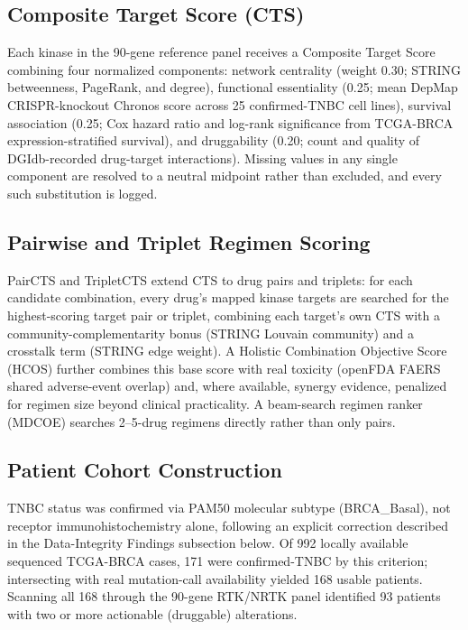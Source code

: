 \documentclass[10pt,letterpaper]{article}
\begin{document}
\subsection*{Composite Target Score (CTS)}
Each kinase in the 90-gene reference panel receives a Composite Target Score combining four normalized components: network centrality (weight 0.30; STRING betweenness, PageRank, and degree), functional essentiality (0.25; mean DepMap CRISPR-knockout Chronos score across 25 confirmed-TNBC cell lines), survival association (0.25; Cox hazard ratio and log-rank significance from TCGA-BRCA expression-stratified survival), and druggability (0.20; count and quality of DGIdb-recorded drug-target interactions). Missing values in any single component are resolved to a neutral midpoint rather than excluded, and every such substitution is logged.

\subsection*{Pairwise and Triplet Regimen Scoring}
PairCTS and TripletCTS extend CTS to drug pairs and triplets: for each candidate combination, every drug's mapped kinase targets are searched for the highest-scoring target pair or triplet, combining each target's own CTS with a community-complementarity bonus (STRING Louvain community) and a crosstalk term (STRING edge weight). A Holistic Combination Objective Score (HCOS) further combines this base score with real toxicity (openFDA FAERS shared adverse-event overlap) and, where available, synergy evidence, penalized for regimen size beyond clinical practicality. A beam-search regimen ranker (MDCOE) searches 2--5-drug regimens directly rather than only pairs.

\subsection*{Patient Cohort Construction}
TNBC status was confirmed via PAM50 molecular subtype (BRCA\_Basal), not receptor immunohistochemistry alone, following an explicit correction described in the Data-Integrity Findings subsection below. Of 992 locally available sequenced TCGA-BRCA cases, 171 were confirmed-TNBC by this criterion; intersecting with real mutation-call availability yielded 168 usable patients. Scanning all 168 through the 90-gene RTK/NRTK panel identified 93 patients with two or more actionable (druggable) alterations.
\end{document}
